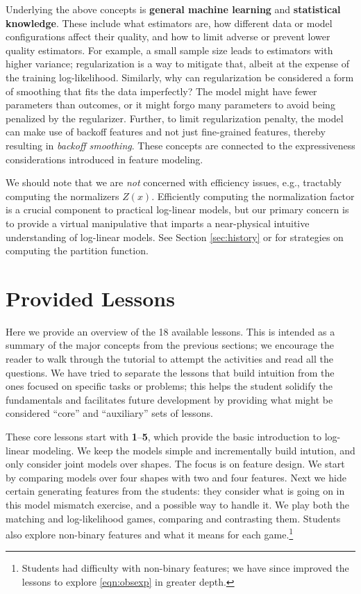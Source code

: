 \documentclass[11pt,letterpaper]{article}
\newcommand{\Note}[1]{}
\renewcommand{\Note}[1]{\hl{[#1]}}  %
\newcommand{\NoteSigned}[3]{{\sethlcolor{#2}\Note{#1: #3}}}
\newcommand{\NoteFF}[1]{\NoteSigned{FF}{LightBlue}{#1}}
\newcommand{\NumLessons}[0]{18}%
\begin{document}
Underlying the above concepts is \textbf{general machine learning} and 
\textbf{statistical knowledge}. These include what estimators are,  how different data or model configurations 
affect their quality, and how to limit adverse or prevent lower quality estimators. For example, 
a small sample size leads to estimators with higher variance; regularization is a way to mitigate that, albeit at the expense of 
the training log-likelihood. 
Similarly, why can regularization be considered a form of smoothing that fits the data 
imperfectly? The model might have fewer parameters than 
outcomes, or it might forgo many parameters to avoid being penalized by 
the regularizer.  Further, to limit regularization penalty, the model can make 
use of backoff features and not just fine-grained features, thereby resulting 
in \textit{backoff smoothing}. These concepts are connected to the expressiveness 
considerations introduced in feature modeling.

We should note that we are \textit{not} concerned with efficiency issues, e.g.,  
tractably computing the normalizers $Z(x)$. Efficiently computing the normalization 
factor is a crucial component to practical log-linear models, but our primary concern is to provide a virtual 
manipulative that imparts a near-physical intuitive understanding of log-linear models. See Section 
\ref{sec:history} or  for strategies on computing the partition function. 



\section{Provided Lessons}\label{sec:lessons}
Here we provide an overview of the \NumLessons{} available lessons. This is intended as a 
summary of the major concepts from the previous sections; we encourage the reader to 
walk through the tutorial to attempt the activities and read all the questions. We have tried to 
separate the lessons that build intuition from the ones focused on specific tasks or problems; this helps 
the student solidify the fundamentals and facilitates future development by providing what might be considered 
``core'' and ``auxiliary'' sets of lessons.

These core lessons start with \textbf{1}--\textbf{5}, which provide the basic introduction to log-linear modeling. We keep 
the models simple and incrementally build intution, and only consider joint models over shapes. The focus is 
on feature design. We start by comparing models over four shapes with two and four features. 
Next we hide certain generating features from the students: they 
consider what is going on in this model mismatch exercise, and a possible way to handle it. We play both the 
matching and log-likelihood games, comparing and contrasting them. Students also explore 
non-binary features and what it means for each game.\footnote{Students had difficulty with non-binary features; 
we have since improved the lessons to explore \eqref{eqn:obsexp} in greater depth.} 
\end{document}
